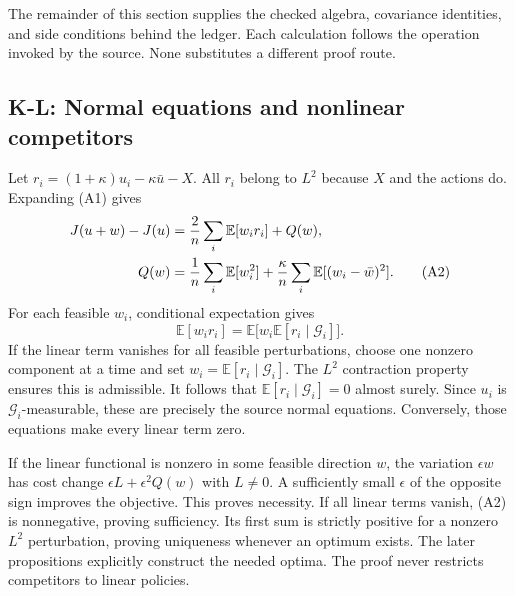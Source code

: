 \documentclass[11pt,letterpaper]{article}
\newcommand{\E}{\mathbb E}
\newcommand{\G}{\mathcal G}
\newcommand{\calculation}[2]{\subsection{#1: #2}}
\begin{document}
The remainder of this section supplies the checked algebra, covariance identities, and side conditions behind the ledger. Each calculation follows the operation invoked by the source. None substitutes a different proof route.

\calculation{K-L}{Normal equations and nonlinear competitors}
Let $r_i=(1+\kappa)u_i-\kappa\bar u-X$. All $r_i$ belong to $L^2$ because $X$ and the actions do. Expanding (A1) gives
\begin{align}
J(u+w)-J(u)
&=\frac2n\sum_i\E[w_i r_i]+Q(w),\notag\\
Q(w)&=\frac1n\sum_i\E[w_i^2]
+\frac\kappa n\sum_i\E[(w_i-\bar w)^2].\tag{A2}
\end{align}
For each feasible $w_i$, conditional expectation gives
\[
\E[w_i r_i]=\E\bigl[w_i\E[r_i\mid\G_i]\bigr].
\]
If the linear term vanishes for all feasible perturbations, choose one nonzero component at a time and set $w_i=\E[r_i\mid\G_i]$. The $L^2$ contraction property ensures this is admissible. It follows that $\E[r_i\mid\G_i]=0$ almost surely. Since $u_i$ is $\G_i$-measurable, these are precisely the source normal equations. Conversely, those equations make every linear term zero.

If the linear functional is nonzero in some feasible direction $w$, the variation $\epsilon w$ has cost change $\epsilon L+\epsilon^2Q(w)$ with $L\ne0$. A sufficiently small $\epsilon$ of the opposite sign improves the objective. This proves necessity. If all linear terms vanish, (A2) is nonnegative, proving sufficiency. Its first sum is strictly positive for a nonzero $L^2$ perturbation, proving uniqueness whenever an optimum exists. The later propositions explicitly construct the needed optima. The proof never restricts competitors to linear policies.
\end{document}
